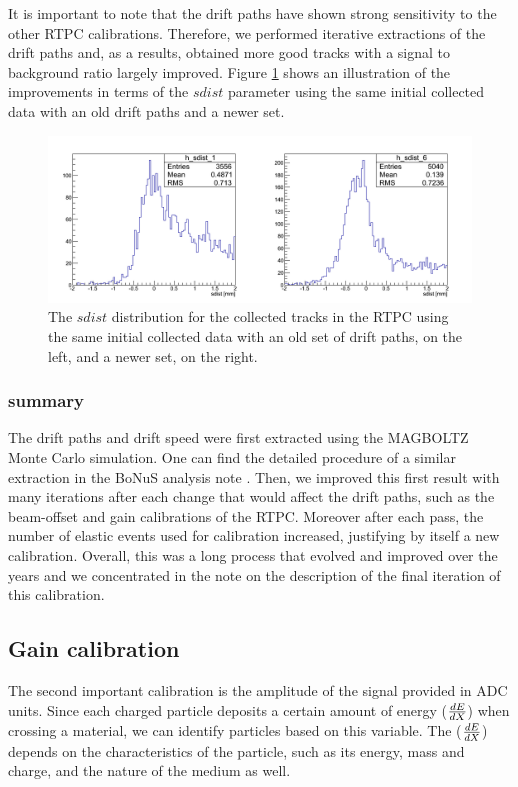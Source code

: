 It is important to note that the drift paths have shown strong sensitivity 
to the other RTPC calibrations. Therefore, we performed iterative extractions 
of the drift paths and, as a results, obtained more good tracks with a signal 
to background ratio largely improved. Figure \ref{fig:sdist_comp_pass1v1_v6} 
shows an illustration of the improvements in terms of the $sdist$ parameter 
using the same initial collected data with an old drift paths and a newer set.

\begin{figure}[tp]
\centering
\includegraphics[scale=0.38]{fig_rtpc/sdist_comp_pass1_v1_v6.png}
\caption{The $sdist$ distribution for the collected tracks in the RTPC using 
the same initial collected data with an old set of drift paths, on the left, 
and a newer set, on the right.}
\label{fig:sdist_comp_pass1v1_v6}
\end{figure}

\subsubsection{summary}
The drift paths and drift speed were first extracted using the
MAGBOLTZ Monte Carlo simulation. One can find the detailed procedure of
a similar extraction in the BoNuS analysis note \cite{GEM_holes}.
Then, we improved this first result with many iterations after each change that 
would affect the drift paths, such as the beam-offset and gain calibrations of 
the RTPC. Moreover after each pass, the number of elastic events used for 
calibration increased, justifying by itself a new calibration. Overall, this 
was a long process that evolved and improved over the years and we concentrated 
in the note on the description of the final iteration of this calibration.


\subsection{Gain calibration}
The second important calibration is the amplitude of the signal provided in ADC 
units. Since each charged particle deposits a certain amount of energy 
($\small{\frac{dE}{dX}}$) when crossing a material, we can identify particles 
based on this variable. The ($\small{\frac{dE}{dX}}$) depends on the 
characteristics of the particle, such as its energy, mass and charge, and the 
nature of the medium as well. 

